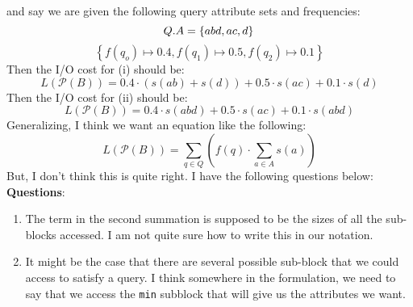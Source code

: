 \documentclass{sig-alternate}
\begin{document}
\noindent 
and say we are given the following query attribute sets and frequencies:
$$
Q.A = \left\{ abd, ac, d \right\}\\
$$
$$
\left\{ f(q_o) \mapsto 0.4,  f(q_1) \mapsto 0.5,  f(q_2) \mapsto 0.1 \right\}
$$
Then the I/O cost for (i) should be:
$$
L(\mathcal{P}(B))  = 0.4 \cdot (s(ab) + s(d)) + 0.5 \cdot s(ac) + 0.1 \cdot s(d) 
$$
Then the I/O cost for (ii) should be:
$$
L(\mathcal{P}(B))  = 0.4 \cdot s(abd) + 0.5 \cdot s(ac) + 0.1 \cdot s(abd) 
$$
\noindent 
Generalizing, I think we want an equation like the following:
$$
L(\mathcal{P}(B)) = \sum_{q\in Q} \left( f(q) \cdot \sum_{a\in A} s(a) \right)
$$
\noindent 
But, I don't think this is quite right. I have the following questions below:\\
\textbf{Questions}:
\begin{enumerate}
\item The term in the second summation is supposed to be the sizes of all the
sub-blocks accessed. I am not quite sure how to write this in our notation. 
\item It might be the case that there are several possible sub-block that we
  could access to satisfy a query. I think somewhere in the formulation, we need
  to say that we access the \texttt{min} subblock that will give us the
  attributes we want.
\end{enumerate}




 
\end{document}
